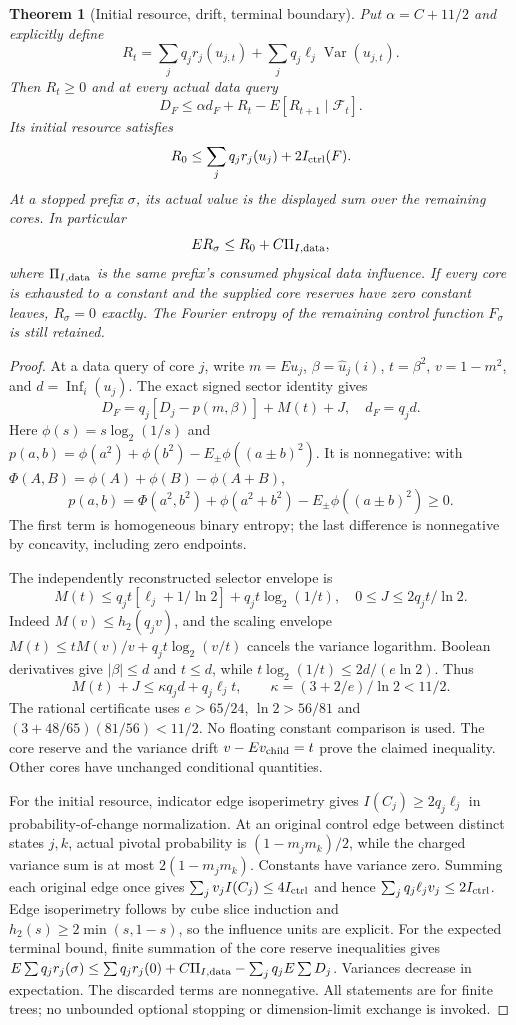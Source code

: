 \documentclass{article}
\newtheorem{theorem}{Theorem}
\begin{document}
\begin{theorem}[Initial resource, drift, terminal boundary]
Put $\alpha=C+11/2$ and explicitly define
\[
R_t=\sum_j q_jr_j(u_{j,t})+\sum_j q_j\ell_j\operatorname{Var}(u_{j,t}).
\]
Then $R_t\ge0$ and at every actual data query
\[
D_F\le\alpha d_F+R_t-E[R_{t+1}\mid\mathcal F_t].
\]
Its initial resource satisfies
\[
R_0\le\sum_jq_jr_j(u_j)+2I_{\rm ctrl}(F).
\]
At a stopped prefix $\sigma$, its actual value is the displayed sum over the
remaining cores. In particular
\[
E R_\sigma\le R_0+C\Pi_{I,\rm data},
\]
where $\Pi_{I,\rm data}$ is the same prefix's consumed physical data influence.
If every core is exhausted to a constant and the supplied core reserves have
zero constant leaves, $R_\sigma=0$ exactly. The Fourier entropy of the remaining
control function $F_\sigma$ is still retained.
\end{theorem}
\begin{proof}
At a data query of core $j$, write $m=Eu_j$, $\beta=\widehat u_j(i)$,
$t=\beta^2$, $v=1-m^2$, and $d=\operatorname{Inf}_i(u_j)$. The exact
signed sector identity gives
\[
D_F=q_j[D_j-p(m,\beta)]+M(t)+J,
\quad d_F=q_jd.
\]
Here $\phi(s)=s\log_2(1/s)$ and
$p(a,b)=\phi(a^2)+\phi(b^2)-E_\pm\phi((a\pm b)^2)$.
It is nonnegative: with $\Phi(A,B)=\phi(A)+\phi(B)-\phi(A+B)$,
\[
p(a,b)=\Phi(a^2,b^2)+\phi(a^2+b^2)-E_\pm\phi((a\pm b)^2)\ge0.
\]
The first term is homogeneous binary entropy; the last difference is
nonnegative by concavity, including zero endpoints.

The independently reconstructed selector envelope is
\[
M(t)\le q_jt[\ell_j+1/\ln2]+q_jt\log_2(1/t),\quad
0\le J\le2q_jt/\ln2.
\]
Indeed $M(v)\le h_2(q_jv)$, and the scaling envelope
$M(t)\le tM(v)/v+q_jt\log_2(v/t)$ cancels the variance logarithm.
Boolean derivatives give $|\beta|\le d$ and $t\le d$, while
$t\log_2(1/t)\le2d/(e\ln2)$. Thus
\[
M(t)+J\le\kappa q_jd+q_j\ell_jt,\qquad
\kappa=(3+2/e)/\ln2<11/2.
\]
The rational certificate uses $e>65/24$, $\ln2>56/81$ and
$(3+48/65)(81/56)<11/2$. No floating constant comparison is used.
The core reserve and the variance drift $v-Ev_{\rm child}=t$ prove
the claimed inequality. Other cores have unchanged conditional quantities.

For the initial resource, indicator edge isoperimetry gives
$I(C_j)\ge2q_j\ell_j$ in probability-of-change normalization.
At an original control edge between distinct states $j,k$, actual pivotal
probability is $(1-m_jm_k)/2$, while the charged variance sum is at most
$2(1-m_jm_k)$. Constants have variance zero. Summing each original edge once
gives $\sum_jv_jI(C_j)\le4I_{\rm ctrl}$ and hence
$\sum_jq_j\ell_jv_j\le2I_{\rm ctrl}$. Edge isoperimetry follows by
cube slice induction and $h_2(s)\ge2\min(s,1-s)$, so the influence units
are explicit. For the expected terminal bound, finite summation of the core
reserve inequalities gives $E\sum q_jr_j(\sigma)\le\sum q_jr_j(0)
+C\Pi_{I,\rm data}-\sum_jq_jE\sum D_j$. Variances decrease in expectation.
The discarded terms are nonnegative. All statements are for finite trees;
no unbounded optional stopping or dimension-limit exchange is invoked.
\end{proof}
\end{document}

